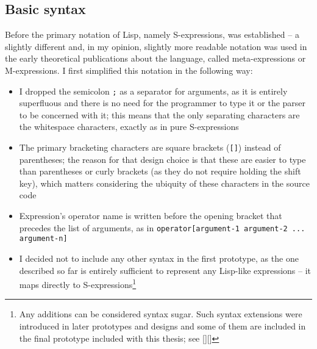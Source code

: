 \subsection{Basic syntax}
Before the primary notation of Lisp, namely
S-expressions,
was established -- a slightly different and, in my opinion, slightly more
readable notation was used in the early theoretical publications about the
language, called meta-expressions or M-expressions\cite[Section~The implementation of LISP]{lisp_draft}. I first
simplified this notation in the following way:


\begin{itemize}
    \item I dropped the semicolon \texttt{;} as a separator for arguments, as it
      is entirely superfluous and there is no need for the programmer to type it
      or the parser to be concerned with it; this means that the only separating
      characters are the whitespace characters, exactly as in pure S-expressions
    \item The primary bracketing characters are square brackets (\texttt{[]})
      instead of parentheses; the reason for that design choice is that these
      are easier to type than parentheses or curly brackets (as they do not
      require holding the shift key), which matters considering the ubiquity of
      these characters in the source code
    \item Expression's operator name is written before the opening bracket that
      precedes the list of arguments, as in \texttt{operator[argument-1
          argument-2 ... argument-n]}
    \item I decided not to include any other syntax in the first prototype, as
      the one described so far is entirely sufficient to represent any Lisp-like
      expressions -- it maps directly to S-expressions\footnote{Any additions
        can be considered syntax sugar. Such syntax extensions were introduced
        in later prototypes and designs and some of them are included in the
        final prototype included with this thesis; see [][]}
\end{itemize}

